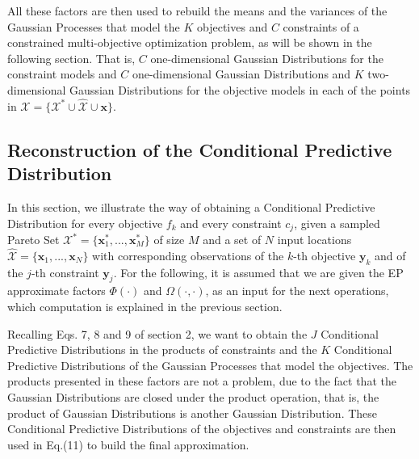 All these factors are then used to rebuild the means and the variances of the Gaussian Processes that model the $K$ objectives and $C$ constraints of a constrained multi-objective optimization problem, as will be shown in the following section. That is, $C$ one-dimensional Gaussian Distributions for the constraint models and $C$ one-dimensional Gaussian Distributions and $K$ two-dimensional Gaussian Distributions for the objective models in each of the points in $\mathcal{X} = \{\mathcal{X}^* \cup \hat{\mathcal{X}} \cup \boldsymbol{x}\}$.

\subsection{Reconstruction of the Conditional Predictive Distribution}
In this section, we illustrate the way of obtaining a Conditional Predictive Distribution for every objective $f_k$ and every constraint $c_j$, given a sampled Pareto Set $\mathcal{X}^* = \{\boldsymbol{x}_1^*,...,\boldsymbol{x}_M^*\}$ of size $M$ and a set of $N$ input locations $\hat{\mathcal{X}} = \{\boldsymbol{x}_1,...,\boldsymbol{x}_N\}$ with corresponding observations of the $k$-th objective $\boldsymbol{y}_k$ and of the $j$-th constraint $\boldsymbol{y}_j$. For the following, it is assumed that we are given the EP approximate factors $\Phi(\cdot)$ and $\Omega(\cdot,\cdot)$, as an input for the next operations, which computation is explained in the previous section.

Recalling Eqs. 7, 8 and 9 of section 2, we want to obtain the $J$ Conditional Predictive Distributions in the products of constraints and the $K$ Conditional Predictive Distributions of the Gaussian Processes that model the objectives. The products presented in these factors are not a problem, due to the fact that the Gaussian Distributions are closed under the product operation, that is, the product of Gaussian Distributions is another Gaussian Distribution. These Conditional Predictive Distributions of the objectives and constraints are then used in Eq.(11) to build the final approximation.

